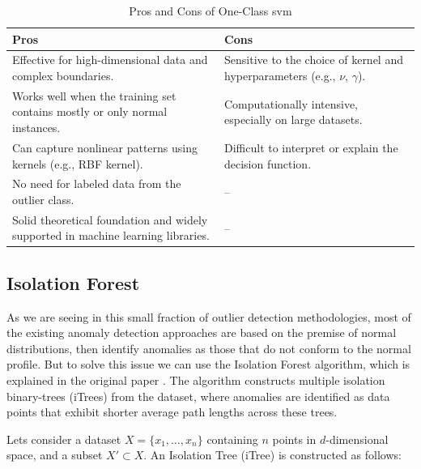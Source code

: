 \documentclass[11pt,english,a4paper,hidelinks]{book}
\begin{document}
\begin{table}[H]
    \centering
    \begin{tabular}{|p{7cm}|p{7cm}|}
        \hline
        \textbf{Pros} & \textbf{Cons} \\
            \hline
            Effective for high-dimensional data and complex boundaries. & Sensitive to the choice of kernel and hyperparameters (e.g., \(\nu\), \(\gamma\)). \\
            \hline
            Works well when the training set contains mostly or only normal instances. & Computationally intensive, especially on large datasets. \\
            \hline
            Can capture nonlinear patterns using kernels (e.g., RBF kernel). & Difficult to interpret or explain the decision function. \\
            \hline
            No need for labeled data from the outlier class. & -- \\
            \hline
            Solid theoretical foundation and widely supported in machine learning libraries. & -- \\
        \hline
    \end{tabular}
    \caption{Pros and Cons of One-Class \acrshort{svm} }
\end{table}
    
    
\subsection{Isolation Forest}

As we are seeing in this small fraction of outlier detection methodologies, most of the existing anomaly detection approaches are based on the premise of normal distributions, then identify anomalies as those that do not conform to the normal profile. But to solve this issue we can use the Isolation Forest algorithm, which is explained in the original paper \textcite{liu2012isolation}. The algorithm constructs multiple isolation binary-trees (iTrees) from the dataset, where anomalies are identified as data points that exhibit shorter average path lengths across these trees.

\vspace{0.5cm}
\noindent Lets consider a dataset \(X = \{x_1, \dots, x_n\}\) containing \(n\) points in \(d\)-dimensional space, and a subset \(X' \subset X\). An Isolation Tree (iTree) is constructed as follows:
\end{document}
